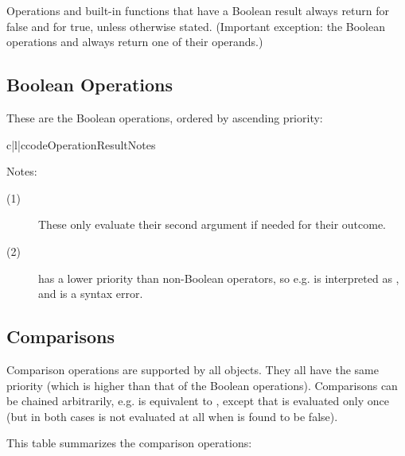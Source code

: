 Operations and built-in functions that have a Boolean result always
return  for false and  for true, unless otherwise
stated.  (Important exception: the Boolean operations
 and  always return one of
their operands.)


\subsection{Boolean Operations \label{boolean}}

These are the Boolean operations, ordered by ascending priority:

\begin{tableiii}{c|l|c}{code}{Operation}{Result}{Notes}
  \hline
\end{tableiii}

\noindent
Notes:

\begin{description}

\item[(1)]
These only evaluate their second argument if needed for their outcome.

\item[(2)]
 has a lower priority than non-Boolean operators, so e.g.
 is interpreted as , and
 is a syntax error.

\end{description}


\subsection{Comparisons \label{comparisons}}

Comparison operations are supported by all objects.  They all have the
same priority (which is higher than that of the Boolean operations).
Comparisons can be chained arbitrarily, e.g.  is
equivalent to , except that  is
evaluated only once (but in both cases  is not evaluated at
all when  is found to be false).

This table summarizes the comparison operations:

